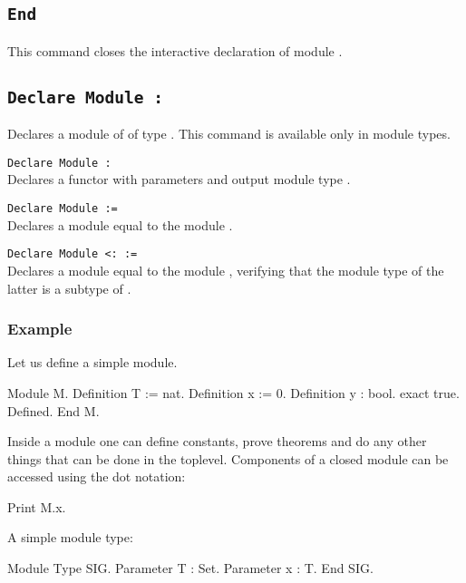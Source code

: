 \subsection{\tt End {\ident}}
This command closes the interactive declaration of module {\ident}.

\subsection{\tt Declare Module {\ident} : {\modtype}}
Declares a module of {\ident} of type {\modtype}. This command is available
only in module types. 

\begin{Variants}
\item{\tt Declare Module {\ident} {\modbindings} \verb.:. {\modtype}}\\
  Declares a functor with parameters {\modbindings} and output module
  type {\modtype}.
\item{\tt Declare Module {\ident} := {\qualid}}\\
  Declares a module equal to the module {\qualid}.
\item{\tt Declare Module {\ident} \verb.<:. {\modtype} := {\qualid}}\\
  Declares a module equal to the module {\qualid}, verifying that the
  module type of the latter is a subtype of {\modtype}.
\end{Variants}


\subsubsection{Example}

Let us define a simple module.
\begin{coq_example}
Module M.
  Definition T := nat.
  Definition x := 0.
  Definition y : bool.
    exact true.
  Defined.
End M.
\end{coq_example}

\noindent
Inside a module one can define constants, prove theorems and do any
other things that can be done in the toplevel. Components of a closed
module can be accessed using the dot notation:

\begin{coq_example}
Print M.x.
\end{coq_example}
A simple module type:
\begin{coq_example}
Module Type SIG.
  Parameter T : Set.
  Parameter x : T.
End SIG.
\end{coq_example}

